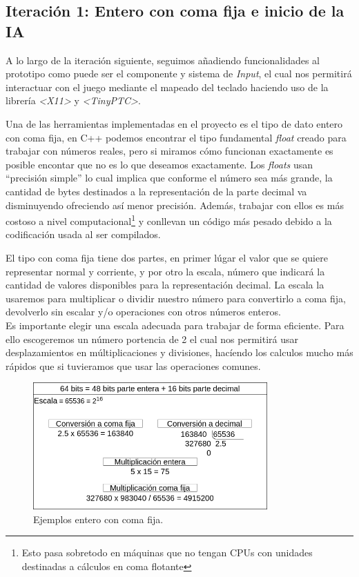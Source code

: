 \subsection*{Iteración 1: Entero con coma fija e inicio de la IA}
A lo largo de la iteración siguiente, seguimos añadiendo funcionalidades al prototipo como puede 
ser el componente y sistema de \textit{Input}, el cual nos permitirá interactuar con el juego
mediante el mapeado del teclado haciendo uso de la librería \textit{\textless X11\textgreater}
y \textit{\textless TinyPTC\textgreater}.

Una de las herramientas implementadas en el proyecto es el tipo de dato entero con coma fija,
en C++ podemos encontrar el tipo fundamental \textit{float} creado para trabajar con números 
reales, pero si miramos cómo funcionan exactamente es posible encontar que no es lo que deseamos
exactamente. Los \textit{floats} usan ``precisión simple'' lo cual implica que conforme el número 
sea más grande, la cantidad de bytes destinados a la representación de la parte decimal va 
disminuyendo ofreciendo así menor precisión. Además, trabajar con ellos es más costoso a nivel
computacional\footnote{Esto pasa sobretodo en máquinas que no tengan CPUs con unidades destinadas 
a cálculos en coma flotante} y conllevan un código más pesado debido a la codificación usada 
al ser compilados.

El tipo con coma fija tiene dos partes, en primer lúgar el valor que se quiere representar normal
y corriente, y por otro la escala, número que indicará la cantidad de valores disponibles
para la representación decimal. La escala la usaremos para multiplicar o dividir nuestro número
para convertirlo a coma fija, devolverlo sin escalar y/o operaciones con otros números enteros.\\
Es importante elegir una escala adecuada para trabajar de forma eficiente. Para ello escogeremos
un número portencia de 2 el cual nos permitirá usar desplazamientos en múltiplicaciones y divisiones,
hacíendo los calculos mucho más rápidos que si tuvieramos que usar las operaciones comunes.

\begin{figure}[htb]
\centering
\includegraphics[width=0.8\textwidth]{imagenes/diario_desarrollo/Entero_fijo.png}
\caption{Ejemplos entero con coma fija.}
\label{fig:fixed}
\end{figure} 

